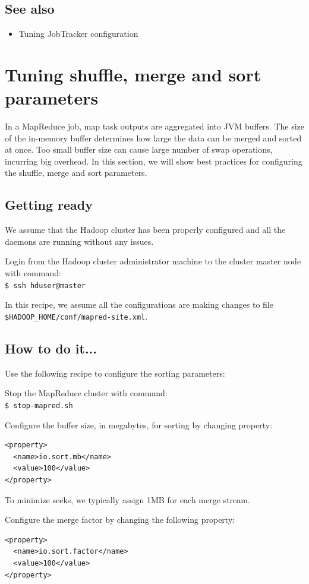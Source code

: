 \subsection*{See also}
\begin{itemize}
  \item Tuning JobTracker configuration
\end{itemize}

\section{Tuning shuffle, merge and sort parameters}
In a MapReduce job, map task outputs are aggregated into JVM buffers. The size of the in-memory buffer determines how large the data can be merged and sorted at once. Too small buffer size can cause large number of swap operations, incurring big overhead. In this section, we will show best practices for configuring the shuffle, merge and sort parameters.
\subsection*{Getting ready}
We assume that the Hadoop cluster has been properly configured and all the daemons are running without any issues.

Login from the Hadoop cluster administrator machine to the cluster master node with command: \\
\verb|$ ssh hduser@master|

In this recipe, we assume all the configurations are making changes to file \verb|$HADOOP_HOME/conf/mapred-site.xml|.
\subsection*{How to do it...}
Use the following recipe to configure the sorting parameters:

Stop the MapReduce cluster with command: \\
\verb|$ stop-mapred.sh|

Configure the buffer size, in megabytes, for sorting by changing property:
\lstset{style=bashstyle}
\begin{lstlisting}
<property>
  <name>io.sort.mb</name>
  <value>100</value>
</property>
\end{lstlisting}

To minimize seeks, we typically assign 1MB for each merge stream.


Configure the merge factor by changing the following property:
\lstset{style=bashstyle}
\begin{lstlisting}
<property>
  <name>io.sort.factor</name>
  <value>100</value>
</property>
\end{lstlisting}

